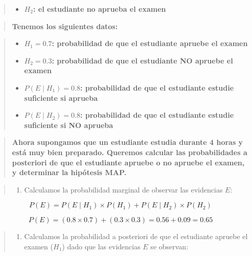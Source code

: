 \documentclass[
  a4paper,
  DIV=11,
  numbers=noendperiod]{scrreprt}
\providecommand{\tightlist}{%
  \setlength{\itemsep}{0pt}\setlength{\parskip}{0pt}}\usepackage{longtable,booktabs,array}
\begin{document}
\begin{quote}
\begin{itemize}
\tightlist
\item
  \(H_2\)\textbf{: el estudiante no aprueba el examen}
\end{itemize}
\end{quote}

\begin{quote}
\textbf{Tenemos los siguientes datos:}
\end{quote}

\begin{quote}
\begin{itemize}
\tightlist
\item
  \(H_1 = 0.7\)\textbf{: probabilidad de que el estudiante apruebe el
  examen}
\item
  \(H_2 = 0.3\)\textbf{: probabilidad de que el estudiante NO apruebe el
  examen}
\item
  \(P(E\mid H_1) = 0.8\)\textbf{: probabilidad de que el estudiante
  estudie suficiente si aprueba}
\item
  \(P(E\mid H_2) = 0.8\)\textbf{: probabilidad de que el estudiante
  estudie suficiente si NO aprueba}
\end{itemize}
\end{quote}

\begin{quote}
\textbf{Ahora supongamos que un estudiante estudia durante 4 horas y
está muy bien preparado. Queremos calcular las probabilidades a
posteriori de que el estudiante apruebe o no apruebe el examen, y
determinar la hipótesis MAP.}
\end{quote}

\begin{quote}
\begin{enumerate}
\def\labelenumi{\arabic{enumi}.}
\tightlist
\item
  Calculamos la probabilidad marginal de observar las evidencias \(E\):
\end{enumerate}
\end{quote}

\[
P(E) = P(E \mid H_1) \times P(H_1) + P(E \mid H_2) \times P(H_2)
\]

\[
P(E) = (0.8 \times 0.7) + (0.3 \times 0.3) = 0.56 + 0.09 = 0.65
\]

\begin{quote}
\begin{enumerate}
\def\labelenumi{\arabic{enumi}.}
\setcounter{enumi}{1}
\tightlist
\item
  Calculamos la probabilidad a posteriori de que el estudiante apruebe
  el examen (\(H_1\)) dado que las evidencias \(E\) se observan:
\end{enumerate}
\end{quote}
\end{document}
